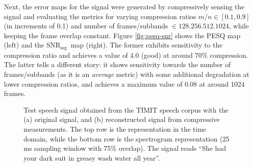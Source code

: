 \documentclass[10pt,a4paper,twoside]{article}
\newcommand{\snrseg}{SNR$_{\mathrm{seg}}$}
\begin{document}
Next, the error maps for the signal were generated by compressively sensing the signal and evaluating the metrics for varying compression ratios $m/n \in [0.1, 0.9]$ (in increments of 0.1) and number of frames/subbands $\in \qty{128, 256, 512, 1024}$, while keeping the frame overlap constant. Figure \ref{fig:pesq-snr} shows the PESQ map (left) and the \snrseg~map (right). The former exhibits sensitivity to the compression ratio and achieves a value of 4.0 (good) at around 70\% compression. The latter tells a different story: it shows sensitivity towards the number of frames/subbands (as it is an \textit{average} metric) with some additional degradation at lower compression ratios, and achieves a maximum value of 0.08 at around 1024 frames.


\begin{figure}[tbp]
	\centering
	\quad %
	\caption{Test speech signal obtained from the TIMIT speech corpus with the (a) original signal, and (b) reconstructed signal from compressive measurements. The top row is the representation in the time domain, while the bottom row is the spectrogram representation (25 ms sampling window with 75\% overlap). The signal reads ``She had your dark suit in greasy wash water all year''.}\label{fig:spectrogram}
\end{figure}
\end{document}
